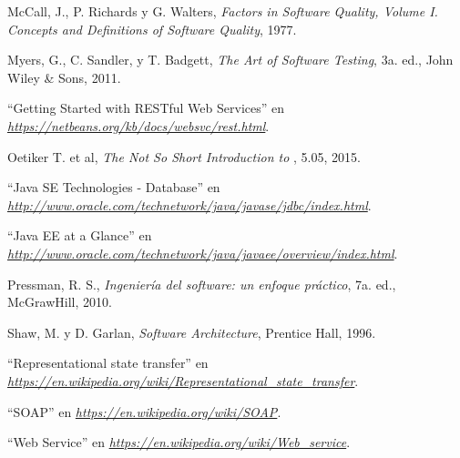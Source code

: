 \begin{thebibliography}{}
	McCall, J., P. Richards y G. Walters,
	\emph{Factors in Software Quality, Volume I. Concepts and Definitions of Software Quality}, 
	1977.

	Myers, G., C. Sandler, y T. Badgett,
	\emph{The Art of Software Testing},
	3a. ed.,
	John Wiley \& Sons, 
	2011.
	
	``Getting Started with RESTful Web Services'' en
	\emph{\url{https://netbeans.org/kb/docs/websvc/rest.html}}.
	
	Oetiker T. et al,
	\emph{The Not So Short Introduction to \LaTeXe},
	5.05,
	2015.
	
	``Java SE Technologies - Database'' en	
	\emph{\url{http://www.oracle.com/technetwork/java/javase/jdbc/index.html}}.
	
	``Java EE at a Glance'' en
	\emph{\url{http://www.oracle.com/technetwork/java/javaee/overview/index.html}}.
	
	Pressman, R. S.,
	\emph{Ingeniería del software: un enfoque práctico},
	7a. ed.,
	McGrawHill,
	2010.
	
	Shaw, M. y D. Garlan, 
	\emph{Software Architecture}, 
	Prentice Hall, 
	1996.
	
	``Representational state transfer'' en
	\emph{\url{https://en.wikipedia.org/wiki/Representational_state_transfer}}.
	
	``SOAP'' en
	\emph{\url{https://en.wikipedia.org/wiki/SOAP}}.
	
	``Web Service'' en
	\emph{\url{https://en.wikipedia.org/wiki/Web_service}}.

\end{thebibliography}